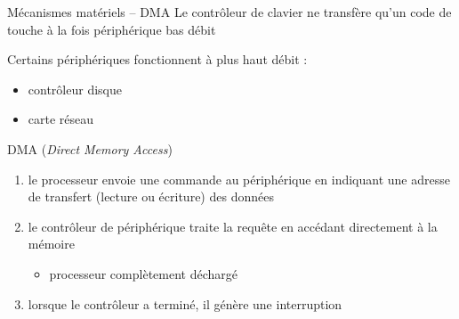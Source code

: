 \begin {frame} {Mécanismes matériels -- DMA}
    Le contrôleur de clavier ne transfère qu'un code de touche à
    la fois \implique périphérique bas débit

    \vspace* {3mm}

    Certains périphériques fonctionnent à plus haut débit :

    \begin {itemize}
	\item contrôleur disque
	\item carte réseau
    \end {itemize}

    \implique DMA (\textit {Direct Memory Access})

    \begin {enumerate}
	\item le processeur envoie une commande au périphérique en
	    indiquant une adresse de transfert (lecture ou écriture)
	    des données

	\item le contrôleur de périphérique traite la requête en
	    accédant directement à la mémoire
	    \begin {itemize}
		\item processeur complètement déchargé
	    \end {itemize}

	\item lorsque le contrôleur a terminé, il génère une interruption

    \end {enumerate}
\end {frame}



